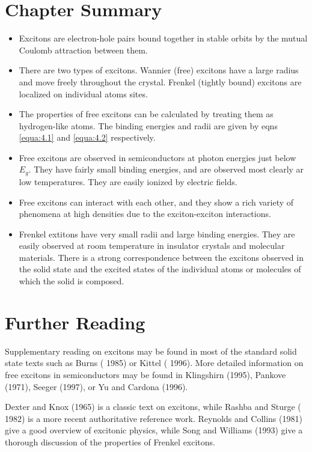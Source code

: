 \documentclass[12pt]{book}
\begin{document}
\section*{Chapter Summary}
\begin{shaded}
\begin{itemize}
  \item Excitons are electron-hole pairs bound together in stable orbits by the mutual Coulomb attraction between them.
  \item There are two types of excitons. Wannier (free) excitons have a large radius and move freely throughout the crystal. Frenkel (tightly bound) excitons are localized on individual atoms sites.
  \item The properties of free excitons can be calculated by treating them as hydrogen-like atoms. The binding energies and radii are given by eqns \ref{equa:4.1} and \ref{equa:4.2} respectively.
  \item Free excitons are observed in semiconductors at photon energies just below $E_g$. They have fairly small  binding energies, and are observed most clearly ar low temperatures. They are easily ionized by electric fields.
  \item Free excitons can interact with each other, and they show a rich variety of phenomena at high densities due to the exciton-exciton interactions.
  \item Frenkel extitons have very small radii and large binding energies. They are easily observed at room temperature in insulator crystals and molecular materials. There is a strong correspondence between the excitons observed in the solid state and the excited states of the individual atoms or molecules of which the solid is composed.
\end{itemize}
\end{shaded}

\section*{Further Reading}
Supplementary reading on excitons may be found in most of the standard solid state texts such as Burns ( 1985) or Kittel ( 1996). More detailed information on free excitons in semiconductors may be found in Klingshirn (1995), Pankove (1971), Seeger (1997), or Yu and Cardona (1996).

Dexter and Knox (1965) is a classic text on excitons, while Rashba and Sturge ( 1982) is a more recent authoritative reference work. Reynolds and Collins (1981) give a good overview of excitonic physics, while Song and Williams (1993) give a thorough discussion of the properties of Frenkel excitons.
\end{document}
